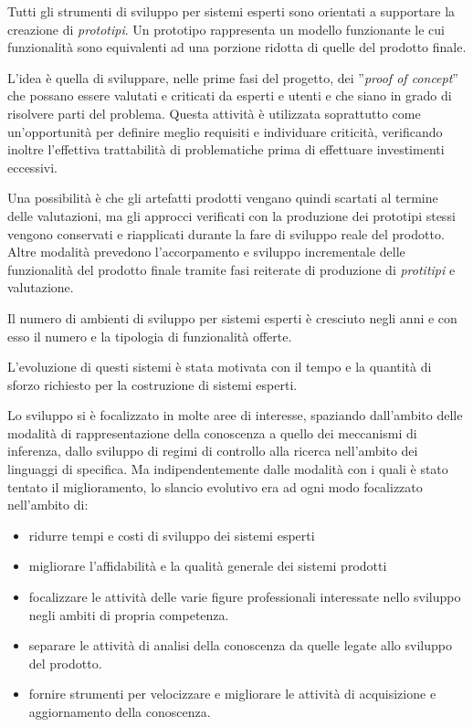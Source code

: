 Tutti gli strumenti di sviluppo per sistemi esperti sono orientati a supportare la creazione di \emph{prototipi}. Un prototipo rappresenta un modello funzionante le cui funzionalità sono equivalenti ad una porzione ridotta di quelle del prodotto finale. \cite{jackson1999}

L'idea è quella di sviluppare, nelle prime fasi del progetto, dei ''\emph{proof of concept}'' che possano essere valutati e criticati da esperti e utenti e che siano in grado di risolvere parti del problema. Questa attività è utilizzata soprattutto come un'opportunità per definire meglio requisiti e individuare criticità, verificando inoltre l'effettiva trattabilità di problematiche prima di effettuare investimenti eccessivi.

Una possibilità è che gli artefatti prodotti vengano quindi scartati al termine delle valutazioni, ma gli approcci verificati con la produzione dei prototipi stessi vengono conservati e riapplicati durante la fare di sviluppo reale del prodotto. Altre modalità prevedono l'accorpamento e sviluppo incrementale delle funzionalità del prodotto finale tramite fasi reiterate di produzione di \emph{protitipi} e valutazione.

Il numero di ambienti di sviluppo per sistemi esperti è cresciuto negli anni e con esso il numero e la tipologia di funzionalità offerte.

L'evoluzione di questi sistemi è stata motivata con il tempo e la quantità di sforzo richiesto per la costruzione di sistemi esperti.

Lo sviluppo si è focalizzato in molte aree di interesse, spaziando dall'ambito delle modalità di rappresentazione della conoscenza a quello dei meccanismi di inferenza, dallo sviluppo di regimi di controllo alla ricerca nell'ambito dei linguaggi di specifica. Ma indipendentemente dalle modalità con i quali è stato tentato il miglioramento, lo slancio evolutivo era ad ogni modo focalizzato nell'ambito di:
\begin{itemize}
	\item ridurre tempi e costi di sviluppo dei sistemi esperti
	\item migliorare l'affidabilità e la qualità generale dei sistemi prodotti
	\item focalizzare le attività delle varie figure professionali interessate nello sviluppo negli ambiti di propria competenza.
	\item separare le attività di analisi della conoscenza da quelle legate allo sviluppo del prodotto.
	\item fornire strumenti per velocizzare e migliorare le attività di acquisizione e aggiornamento della conoscenza.
\end{itemize}

